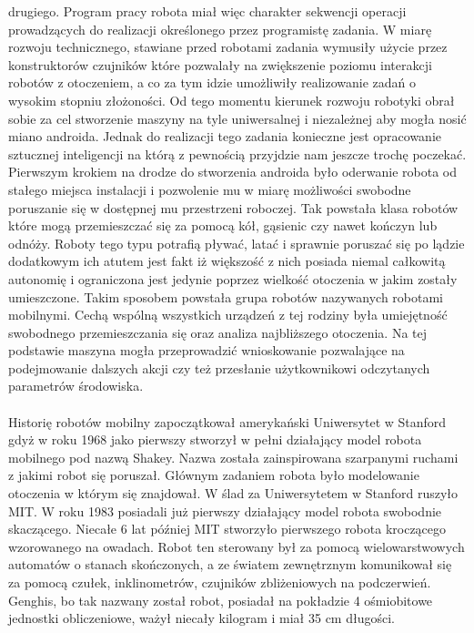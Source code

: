 drugiego. Program pracy robota miał więc charakter sekwencji operacji
prowadzących do realizacji określonego przez programistę zadania. W miarę
rozwoju technicznego, stawiane przed robotami zadania wymusiły użycie przez
konstruktorów czujników które pozwalały na zwiększenie poziomu interakcji
robotów z otoczeniem, a co za tym idzie umożliwiły realizowanie zadań o wysokim
stopniu złożoności. Od tego momentu kierunek rozwoju robotyki obrał
sobie za cel stworzenie maszyny na tyle uniwersalnej i niezależnej aby mogła
nosić miano androida. Jednak do realizacji tego zadania konieczne jest
opracowanie sztucznej inteligencji na którą z pewnością przyjdzie nam jeszcze
trochę poczekać. 
\newpage
Pierwszym krokiem na drodze do stworzenia androida było oderwanie robota od
stałego miejsca instalacji i pozwolenie mu w miarę możliwości swobodne
poruszanie się w dostępnej mu przestrzeni roboczej. Tak powstała klasa robotów
które mogą przemieszczać się za pomocą kół, gąsienic czy nawet kończyn lub
odnóży. Roboty tego typu potrafią pływać, latać i sprawnie poruszać się
po lądzie dodatkowym ich atutem jest fakt iż większość z nich posiada niemal
całkowitą autonomię i ograniczona jest jedynie poprzez wielkość otoczenia w
jakim zostały umieszczone. Takim sposobem powstała grupa robotów
nazywanych robotami mobilnymi. Cechą wspólną wszystkich urządzeń z tej rodziny
była umiejętność swobodnego przemieszczania się oraz analiza najbliższego
otoczenia. Na tej podstawie maszyna mogła przeprowadzić wnioskowanie pozwalające
na podejmowanie dalszych akcji czy też przesłanie użytkownikowi odczytanych
parametrów środowiska.\\
\\
Historię robotów mobilny zapoczątkował amerykański Uniwersytet w Stanford gdyż
w roku 1968 jako pierwszy stworzył w pełni działający model robota mobilnego pod
nazwą Shakey. Nazwa została zainspirowana szarpanymi ruchami z jakimi robot się
poruszał. Głównym zadaniem robota było modelowanie otoczenia w którym się
znajdował. W ślad za Uniwersytetem w Stanford ruszyło MIT. W roku 1983 posiadali
już pierwszy działający model robota swobodnie skaczącego. Niecałe 6
lat później MIT stworzyło pierwszego robota kroczącego wzorowanego na owadach.
Robot ten sterowany był za pomocą wielowarstwowych automatów o stanach
skończonych, a ze światem zewnętrznym komunikował się za pomocą czułek,
inklinometrów, czujników zbliżeniowych na podczerwień. Genghis, bo tak
nazwany został robot, posiadał na pokładzie 4 ośmiobitowe jednostki obliczeniowe, ważył
niecały kilogram i miał 35 cm długości.

